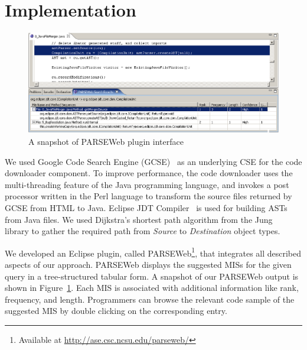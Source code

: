 \section{Implementation}
\label{sec:implementation}
\begin{figure}[t]
\centering
\includegraphics[scale=0.50,clip]{plugin_image1.eps}\vspace*{-2ex}
\caption{A snapshot of PARSEWeb plugin interface} \label{fig:plugin}
\vspace*{-2ex}
\end{figure}
We used Google Code Search Engine (GCSE)~\cite{GCSE} as an
underlying CSE for the code downloader component. To improve
performance, the code downloader uses the multi-threading feature of
the Java programming language, and
invokes a post processor written in the Perl language to transform
the source files returned by GCSE from HTML to Java. Eclipse JDT
Compiler~\cite{java:eclipse} is used for building ASTs from Java
files. We used
Dijkstra's shortest path algorithm from the Jung~\cite{Jung} library
 to gather the
required path from \emph{Source} to \emph{Destination} object types.

We developed an Eclipse plugin, called PARSEWeb\footnote{Available at
\url{http://ase.csc.ncsu.edu/parseweb/}}, that integrates all described aspects
of our approach. PARSEWeb displays the suggested MISs for the given
query in a tree-structured tabular form. A snapshot of our PARSEWeb
output is shown in Figure~\ref{fig:plugin}. Each MIS is associated
with additional information like rank, frequency, and length. Programmers can browse the
relevant code sample of the suggested MIS by double clicking on the
corresponding entry.

